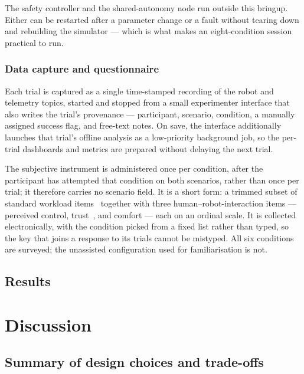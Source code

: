 \documentclass[12pt,a4paper,twoside,openright]{report}
\begin{document}
The safety controller and the shared-autonomy node run outside this bringup. Either can be restarted after a parameter change or a fault without tearing down and rebuilding the simulator --- which is what makes an eight-condition session practical to run.

\subsection{Data capture and questionnaire}
\label{sec:studydata}

Each trial is captured as a single time-stamped recording of the robot and telemetry topics, started and stopped from a small experimenter interface that also writes the trial's provenance --- participant, scenario, condition, a manually assigned success flag, and free-text notes. On save, the interface additionally launches that trial's offline analysis as a low-priority background job, so the per-trial dashboards and metrics are prepared without delaying the next trial.

The subjective instrument is administered once per condition, after the participant has attempted that condition on both scenarios, rather than once per trial; it therefore carries no scenario field. It is a short form: a trimmed subset of standard workload items~\cite{hart1988nasatlx} together with three human--robot-interaction items --- perceived control, trust~\cite{jian2000trust}, and comfort --- each on an ordinal scale. It is collected electronically, with the condition picked from a fixed list rather than typed, so the key that joins a response to its trials cannot be mistyped. All six conditions are surveyed; the unassisted configuration used for familiarisation is not.

\section{Results}


\chapter{Discussion}
\label{ch:discussion}

\section{Summary of design choices and trade-offs}
\end{document}

